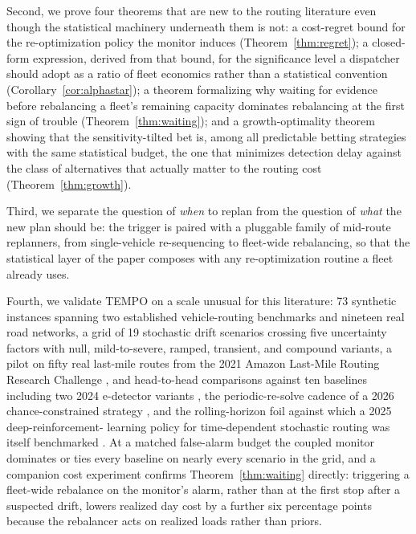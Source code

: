 \documentclass[trsc,dblanonrev]{informs4}
\begin{document}
Second, we prove four theorems that are new to the routing literature
even though the statistical machinery underneath them is not: a
cost-regret bound for the re-optimization policy the monitor induces
(Theorem~\ref{thm:regret}); a closed-form expression, derived from that
bound, for the significance level a dispatcher should adopt as a ratio
of fleet economics rather than a statistical convention
(Corollary~\ref{cor:alphastar}); a theorem formalizing why waiting for
evidence before rebalancing a fleet's remaining capacity dominates
rebalancing at the first sign of trouble
(Theorem~\ref{thm:waiting}); and a growth-optimality theorem showing
that the sensitivity-tilted bet is, among all predictable betting
strategies with the same statistical budget, the one that minimizes
detection delay against the class of alternatives that actually matter
to the routing cost (Theorem~\ref{thm:growth}).

Third, we separate the question of \emph{when} to replan from the
question of \emph{what} the new plan should be: the trigger is
paired with a pluggable family of mid-route replanners, from
single-vehicle re-sequencing to fleet-wide rebalancing, so that the
statistical layer of the paper composes with any re-optimization
routine a fleet already uses.

Fourth, we validate TEMPO on a scale unusual for this literature: 73
synthetic instances spanning two established vehicle-routing
benchmarks and nineteen real road networks, a grid of 19 stochastic
drift scenarios crossing five uncertainty factors with null,
mild-to-severe, ramped, transient, and compound variants, a pilot on
fifty real last-mile routes from the 2021 Amazon Last-Mile Routing
Research Challenge \citep{merchan2024amazon}, and head-to-head
comparisons against ten baselines including two 2024
e-detector variants \citep{shin2024edetectors}, the periodic-re-solve
cadence of a 2026 chance-constrained strategy \citep{he2026smpc}, and
the rolling-horizon foil against which a 2025 deep-reinforcement-
learning policy for time-dependent stochastic routing was itself
benchmarked \citep{chen2025dgta}. At a matched false-alarm budget the
coupled monitor dominates or ties every baseline on nearly every
scenario in the grid, and a companion cost experiment confirms
Theorem~\ref{thm:waiting} directly: triggering a fleet-wide rebalance
on the monitor's alarm, rather than at the first stop after a
suspected drift, lowers realized day cost by a further six percentage
points because the rebalancer acts on realized loads rather than
priors.
\end{document}

